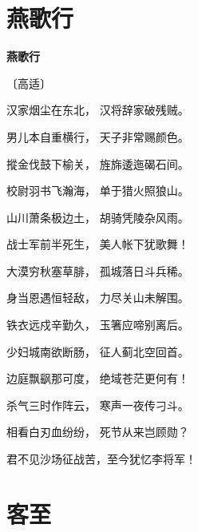 \documentclass[12pt,UTF-8,openany,fontset=none]{ctexbook}
\begin{document}
\vspace{8pt}
\clearpage

\section{燕歌行}


\begin{center}
    {\bfseries 燕歌行}

    \vspace{18pt}

    \begin{large}\xuwen
        〔高适〕
    \end{large}

\end{center}

    \vspace{18pt}  %

\begin{center}
    \begin{Large}

        汉家烟尘在东北， 汉将辞家破残贼。

        男儿本自重横行， 天子非常赐颜色。

        摐金伐鼓下榆关， 旌旆逶迤碣石间。

        校尉羽书飞瀚海， 单于猎火照狼山。

        山川萧条极边土， 胡骑凭陵杂风雨。

        战士军前半死生， 美人帐下犹歌舞！

        大漠穷秋塞草腓， 孤城落日斗兵稀。

        身当恩遇恒轻敌， 力尽关山未解围。

        铁衣远戍辛勤久， 玉箸应啼别离后。

        少妇城南欲断肠， 征人蓟北空回首。

        边庭飘飖那可度， 绝域苍茫更何有！

        杀气三时作阵云， 寒声一夜传刁斗。

        相看白刃血纷纷， 死节从来岂顾勋？

        君不见沙场征战苦，至今犹忆李将军！

    \end{Large}

\end{center}

\vspace{8pt}
\clearpage

\section{客至}
\end{document}
